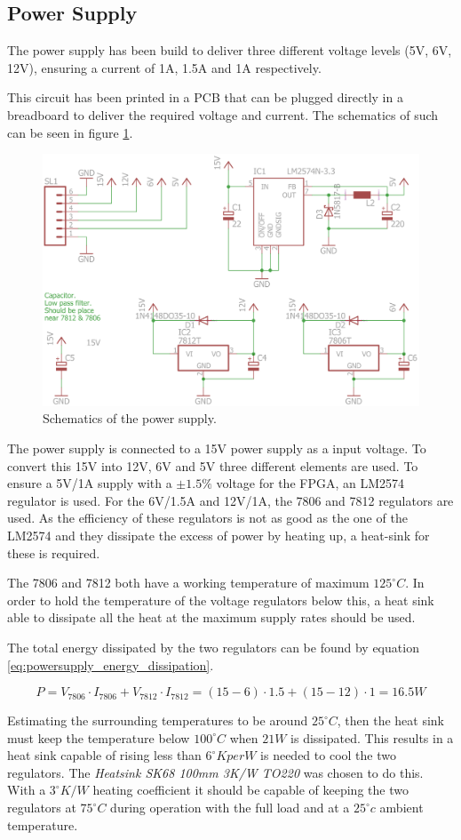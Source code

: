 
\subsection{Power Supply}
The power supply has been build to deliver three different voltage levels (5V, 6V, 12V), ensuring a current of 1A, 1.5A and 1A respectively.

This circuit has been printed in a PCB that can be plugged directly in a breadboard to deliver the required voltage and current.
The schematics of such can be seen in figure \ref{fig:powersupply_schematics}.

\begin{figure}[H]
\centering 
\includegraphics[width = 0.4 \textwidth]{images/powersupply_schematics}
\caption{Schematics of the power supply.}
\label{fig:powersupply_schematics}
\end{figure}


The power supply is connected to a 15V power supply as a input voltage. 
To convert this 15V into 12V, 6V and 5V three different elements are used.
To ensure a 5V/1A supply with a $\pm 1.5\%$ voltage for the FPGA, an LM2574 regulator is used. 
For the 6V/1.5A and 12V/1A, the 7806 and 7812 regulators are used. 
As the efficiency of these regulators is not as good as the one of the LM2574 and they dissipate the excess of power by heating up, a heat-sink for these is required.

The 7806 and 7812 both have a working temperature of maximum $125^{\circ} C$.
In order to hold the temperature of the voltage regulators below this, a heat sink able to dissipate all the heat at the maximum supply rates should be used.

The total energy dissipated by the two regulators can be found by equation \ref{eq:powersupply_energy_dissipation}.

\begin{equation}
P = V_{7806} \cdot I_{7806} + V_{7812} \cdot I_{7812} = (15 - 6) \cdot 1.5 + (15 - 12) \cdot 1 = 16.5W
\label{eq:powersupply_energy_dissipation}
\end{equation}


Estimating the surrounding temperatures to be around $25^{\circ} C$, then the heat sink must keep the temperature below $100^{\circ} C$ when $21W$ is dissipated.
This results in a heat sink capable of rising less than $6 ^{\circ}K per W$ is needed to cool the two regulators.
The \textit{Heatsink SK68 100mm 3K/W TO220} was chosen to do this.
With a $3^{\circ}K/W$ heating coefficient it should be capable of keeping the two regulators at $75^{\circ}C$ during operation with the full load and at a $25^{\circ}c$ ambient temperature.



